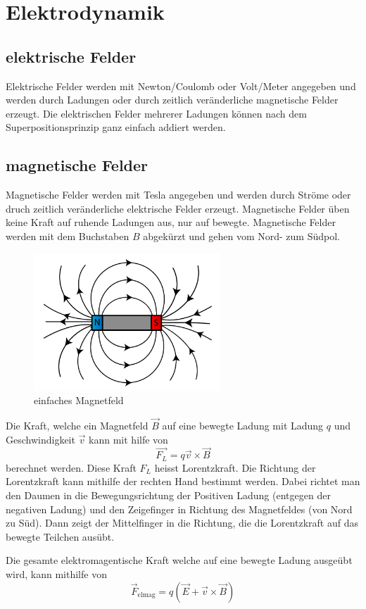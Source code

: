 \documentclass{article}
\begin{document}
\section{Elektrodynamik}
\subsection{elektrische Felder}
Elektrische Felder werden mit Newton/Coulomb oder Volt/Meter angegeben und werden durch Ladungen oder durch zeitlich veränderliche magnetische Felder erzeugt. Die elektrischen Felder mehrerer Ladungen können nach dem Superpositionsprinzip ganz einfach addiert werden.
\subsection{magnetische Felder}
Magnetische Felder werden mit Tesla angegeben und werden durch Ströme oder druch zeitlich veränderliche elektrische Felder erzeugt. Magnetische Felder üben keine Kraft auf ruhende Ladungen aus, nur auf bewegte. Magnetische Felder werden mit dem Buchstaben \(B\) abgekürzt und gehen vom Nord- zum Südpol.
\begin{figure}[h]
		\begin{center}
		\includegraphics[width=7cm]{img/magnetField.png}
		\end{center}
		\caption{einfaches Magnetfeld}
		\label{fig:einfaches Magnetfeld}
\end{figure}
Die Kraft, welche ein Magnetfeld \( \vec{B}\) auf eine bewegte Ladung mit Ladung \(q\) und Geschwindigkeit \( \vec{v}\) kann mit hilfe von \[
\vec{F_L} = q \vec{v} \times \vec{B}
\]
berechnet werden. Diese Kraft \(F_L\) heisst Lorentzkraft. Die Richtung der Lorentzkraft kann mithilfe der rechten Hand bestimmt werden. Dabei richtet man den Daumen in die Bewegungsrichtung der Positiven Ladung (entgegen der negativen Ladung) und den Zeigefinger in Richtung des Magnetfeldes (von Nord zu Süd). Dann zeigt der Mittelfinger in die Richtung, die die Lorentzkraft auf das bewegte Teilchen ausübt.

Die gesamte elektromagentische Kraft welche auf eine bewegte Ladung ausgeübt wird, kann mithilfe von \[
		\vec{F}_{\textrm{elmag}} = q( \vec{E} + \vec{v} \times \vec{B})
\]
\end{document}
